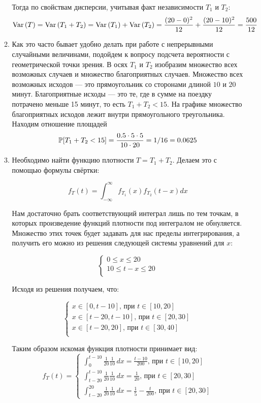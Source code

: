 \begin{enumerate}
\begin{enumerate}
	Тогда по свойствам дисперсии, учитывая факт независимости $T_{1}$ и $T_{2}$:
	\[
	\Var{(T)} = \Var{(T_{1} + T_{2})} = \Var{(T_{1})} + \Var{(T_{2})} = \frac{(20 - 0)^{2}}{12} + \frac{(20 - 10)^{2}}{12} = \frac{500}{12}
	\]
	\item Как это часто бывает удобно делать при работе с непрерывными случайными величинами, подойдем к вопросу подсчета вероятности с геометрической точки зрения. 
	В осях $T_{1}$ и $T_{2}$ изобразим множество всех возможных случаев и множество благоприятных случаев.
	Множество всех возможных исходов — это прямоугольник со сторонами длиной $10$ и $20$ минут. 
	Благоприятные исходы — это те, где в сумме на поездку потрачено меньше 15 минут, то есть $T_{1} + T_{2} < 15$. 
	На графике множество благоприятных исходов лежит внутри прямоугольного треугольника. 
	Находим отношение площадей
	\[
	\P[T_{1} + T_{2} < 15] = \frac{0.5 \cdot 5 \cdot 5}{10 \cdot 20} = 1/16 = 0.0625
	\] 
   \item Необходимо найти функцию плотности $T=T_1 + T_2$. Делаем это с помощью формулы свёртки:
	    
   \[
	   f_T(t)=\int_{-\infty}^{\infty}f_{T_{1}}(x)f_{T_{2}}(t-x)dx
	\]
   
   Нам достаточно брать соответствующий интеграл лишь по тем точкам, в которых произведение функций плотности под интегралом не обнуляется. Множество этих точек будет задавать для нас пределы интегрирования, а получить его можно из решения следующей системы уравнений для $x$:
   
   \[
	   \begin{cases}
				0 \leq x \leq 20 \\
				10 \leq t-x \leq 20 \\
		\end{cases}
\]
   
   Исходя из решения получаем, что:
   
\[
	\begin{cases}
		x \in [0, t-10] \text{, при } t \in [10, 20]\\ 
		x \in [t-20, t-10] \text{, при } t \in [20, 30]\\
	    x \in [t-20, 20] \text{, при } t \in [30, 40] \\
	\end{cases}
\]
   
   Таким образом искомая функция плотности принимает вид:
	\[
		f_T(t)=
			\begin{cases}
				\int_{0}^{t-10} \frac{1}{20} \frac{1}{10} \, dx = \frac{t-10}{200} \text{, при } t \in [10, 20] \\
				\int_{t-20}^{t-10} \frac{1}{20} \frac{1}{10} \, dx = \frac{1}{20} \text{, при } t \in [20, 30]\\ 
				\int_{t-20}^{20} \frac{1}{20} \frac{1}{10} \, dx = \frac{1}{5} - \frac{t}{200} \text{, при } t \in [20, 30]
			\end{cases}
	\]
	

\end{enumerate}
\end{enumerate}
